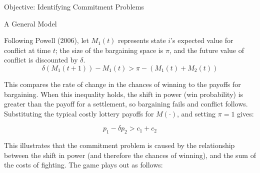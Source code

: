 \documentclass[final]{beamer}
\newlength{\onecolwid}
\begin{document}
\begin{frame}[t]
\begin{columns}[t]
\begin{column}{\onecolwid}
\begin{block}{Objective: Identifying Commitment Problems}
      \end{block}

      \begin{block}{A General Model}
      
Following Powell (2006), let $M_1(t)$ represents state $i$'s expected value for conflict at time $t$; the size of the bargaining space is $\pi$, and the future value of conflict is discounted by $\delta$.
\begin{equation}
\delta(M_1(t+1)) - M_1(t) > \pi - (M_1(t) + M_2(t))
\end{equation}

This compares the rate of change in the chances of winning to the payoffs for bargaining. When this inequality holds, the shift in power (win probability) is greater than the payoff for a settlement, so bargaining fails and conflict follows. Substituting the typical costly lottery payoffs for $M(\cdot)$, and setting $\pi=1$ gives:

\begin{equation}
p_1-\delta p_2 > c_1+c_ 2
\end{equation}

This illustrates that the commitment problem is caused by the relationship between the shift in power (and therefore the chances of winning), and the sum of the costs of fighting.  The game plays out as follows:
%
      

\end{block}
\end{column}
\end{columns}
\end{frame}
\end{document}
